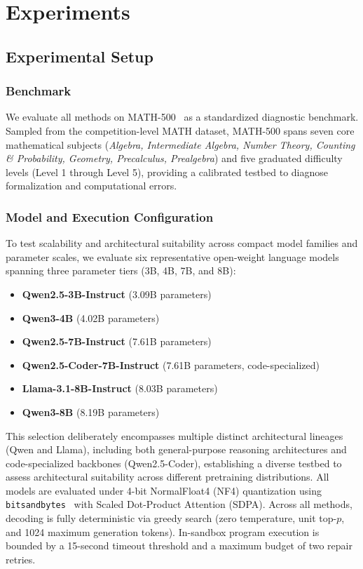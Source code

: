 \documentclass[runningheads]{llncs}
\begin{document}
\section{Experiments}
\label{sec:experiments}

\subsection{Experimental Setup}

\subsubsection{Benchmark}

We evaluate all methods on MATH-500~\cite{lightman2024verify,hendrycks2021math} as a standardized diagnostic benchmark. Sampled from the competition-level MATH dataset, MATH-500 spans seven core mathematical subjects (\textit{Algebra, Intermediate Algebra, Number Theory, Counting \& Probability, Geometry, Precalculus, Prealgebra}) and five graduated difficulty levels (Level 1 through Level 5), providing a calibrated testbed to diagnose formalization and computational errors.

\subsubsection{Model and Execution Configuration}

To test scalability and architectural suitability across compact model families and parameter scales, we evaluate six representative open-weight language models spanning three parameter tiers (3B, 4B, 7B, and 8B):
\begin{itemize}
    \item \textbf{Qwen2.5-3B-Instruct} (3.09B parameters)~\cite{qwen2024qwen25}
    \item \textbf{Qwen3-4B} (4.02B parameters)~\cite{qwen2024qwen25}
    \item \textbf{Qwen2.5-7B-Instruct} (7.61B parameters)~\cite{qwen2024qwen25}
    \item \textbf{Qwen2.5-Coder-7B-Instruct} (7.61B parameters, code-specialized)~\cite{hui2024qwen25coder}
    \item \textbf{Llama-3.1-8B-Instruct} (8.03B parameters)~\cite{dubey2024llama3}
    \item \textbf{Qwen3-8B} (8.19B parameters)~\cite{qwen2024qwen25}
\end{itemize}
This selection deliberately encompasses multiple distinct architectural lineages (Qwen and Llama), including both general-purpose reasoning architectures and code-specialized backbones (Qwen2.5-Coder), establishing a diverse testbed to assess architectural suitability across different pretraining distributions. All models are evaluated under 4-bit NormalFloat4 (NF4) quantization using \texttt{bitsandbytes}~\cite{dettmers2023qlora} with Scaled Dot-Product Attention (SDPA). Across all methods, decoding is fully deterministic via greedy search (zero temperature, unit top-$p$, and 1024 maximum generation tokens). In-sandbox program execution is bounded by a 15-second timeout threshold and a maximum budget of two repair retries.
\end{document}
